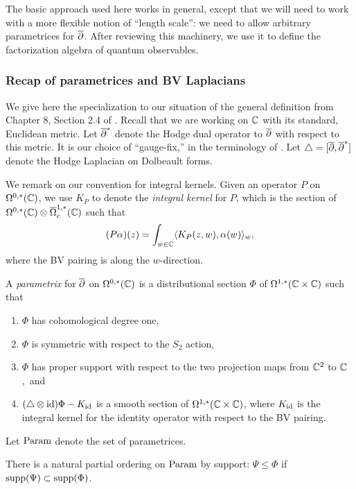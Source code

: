 The basic approach used here works in general, except that we will need to work with a more flexible notion of ``length scale'':
we need to allow arbitrary parametrices for $\overline{\partial}$.
After reviewing this machinery, we use it to define the factorization algebra of quantum observables.

\subsubsection{Recap of parametrices and BV Laplacians}
\label{parametrices}

We give here the specialization to our situation of the general definition from Chapter 8, Section 2.4 of \cite{CG}.
Recall that we are working on $\mathbb C$ with its standard, Euclidean metric.
Let $\overline{\partial}^*$ denote the Hodge dual operator to $\overline{\partial}$ with respect
to this metric. It is our choice of ``gauge-fix,'' in the terminology of \cite{CosBook}.
Let $\triangle = [\overline{\partial},\overline{\partial}^*]$ denote the Hodge Laplacian on Dolbeault forms.

We remark on our convention for integral kernels.
Given an operator $P$ on $\Omega^{0,*}(\mathbb C)$, 
we use $K_P$ to denote the \emph{integral kernel} for $P$,
which is the section of $\Omega^{0,*}(\mathbb C) \otimes \overline{\Omega}^{1,*}_c(\mathbb C)$ such that
\[
(P\alpha)(z) = \int_{w \in \mathbb C} \langle K_P(z,w), \alpha(w)\rangle_w,
\]
where the BV pairing is along the $w$-direction.

\begin{dfn}
A {\em parametrix} for $\overline{\partial}$ on $\Omega^{0,*}(\mathbb C)$ is a distributional section $\Phi$ of
$\Omega^{1,*}(\mathbb C \times \mathbb C)$ such that
\begin{enumerate}
\item $\Phi$ has cohomological degree one,
\item $\Phi$ is symmetric with respect to the $S_2$ action,
\item $\Phi$ has proper support with respect to the two projection maps from $\mathbb C^2$ to $\mathbb C$,~and
\item $(\triangle \otimes {\rm id}) \Phi - K_{{\rm id}}$ is a smooth section of $\Omega^{1,*}(\mathbb C \times \mathbb C)$,
where $K_{{\rm id}}$ is the integral kernel for the identity operator with respect to the BV pairing.
\end{enumerate}
Let ${\rm Param}$ denote the set of parametrices.
\end{dfn}

There is a natural partial ordering on ${\rm Param}$ by support:
$\Psi \leq \Phi$ if ${\rm supp}(\Psi) \subset {\rm supp}(\Phi)$.

